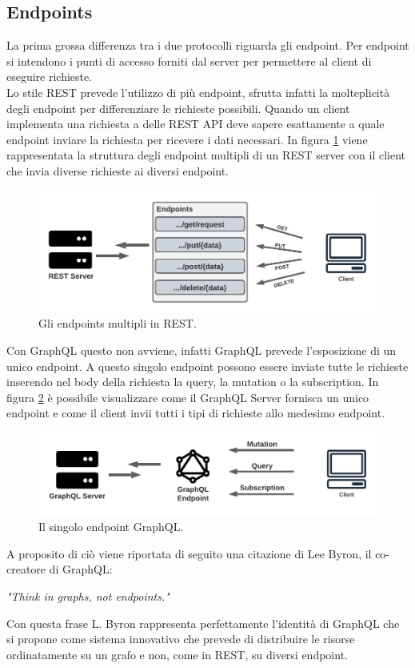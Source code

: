 \subsection{Endpoints}
La prima grossa differenza tra i due protocolli riguarda gli endpoint. Per endpoint si intendono i punti di accesso forniti dal server per permettere al client di eseguire richieste.\\
Lo stile REST prevede l'utilizzo di più endpoint, sfrutta infatti la molteplicità degli endpoint per differenziare le richieste possibili. Quando un client implementa una richiesta a delle REST API deve sapere esattamente a quale endpoint inviare la richiesta per ricevere i dati necessari. In figura \ref{REST-endpoints} viene rappresentata la struttura degli endpoint multipli di un REST server con il client che invia diverse richieste ai diversi endpoint.
\FloatBarrier
\begin{figure}[!ht]
\centering
\includegraphics[width=1\linewidth]{immagini/RESTEndpoints.pdf}
\caption{Gli endpoints multipli in REST.}
\label{REST-endpoints}
\end{figure}
\FloatBarrier
Con GraphQL questo non avviene, infatti GraphQL prevede l'esposizione di un unico endpoint. A questo singolo endpoint possono essere inviate tutte le richieste inserendo nel body della richiesta la query, la mutation o la subscription. In figura \ref{GraphQL-endpoint} è possibile visualizzare come il GraphQL Server fornisca un unico endpoint e come il client invii tutti i tipi di richieste allo medesimo endpoint.
\FloatBarrier
\begin{figure}[!ht]
\centering
\includegraphics[width=1\linewidth]{immagini/GraphQLEndpoint.pdf}
\caption{Il singolo endpoint GraphQL.}
\label{GraphQL-endpoint}
\end{figure}
\FloatBarrier
A proposito di ciò viene riportata di seguito una citazione di Lee Byron, il co-creatore di GraphQL:
\begin{quoting}
  \textit{"Think in graphs, not endpoints."}
\end{quoting}
Con questa frase L. Byron rappresenta perfettamente l'identità di GraphQL che si propone come sistema innovativo che prevede di distribuire le risorse ordinatamente su un grafo e non, come in REST, su diversi endpoint.
